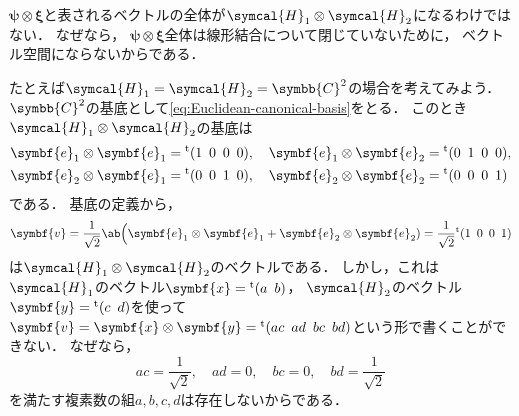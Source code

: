 \documentclass[
]{sotsu}
\newcommand{\bpsi}{\symbf{\psi}}
\newcommand{\bphi}{\symbf{\varphi}}
\newcommand{\bxi}{\symbf{\xi}}
\begin{document}



\bluehead{$\bpsi \otimes \bxi$と書けないテンソル積}\quad 
$\bpsi \otimes \bxi$と表されるベクトルの全体が$\symcal{H}_1 \otimes \symcal{H}_2$になるわけではない．
なぜなら，
$\bpsi \otimes \bxi$全体は線形結合について閉じていないために，
ベクトル空間にならないからである．

たとえば$\symcal{H}_1 = \symcal{H}_2 = \symbb{C}^2$の場合を考えてみよう．
$\symbb{C}^2$の基底として\cref{eq:Euclidean-canonical-basis}をとる．
このとき$\symcal{H}_1 \otimes \symcal{H}_2$の基底は
\begin{equation*}
    \begin{split}
        \symbf{e}_1 \otimes \symbf{e}_1 &= \cvector{1 ; 0 ; 0 ; 0},
        \quad 
        \symbf{e}_1 \otimes \symbf{e}_2 = \cvector{0 ; 1 ; 0 ; 0},
        \\
        \symbf{e}_2 \otimes \symbf{e}_1 &= \cvector{0 ; 0 ; 1 ; 0},
        \quad 
        \symbf{e}_2 \otimes \symbf{e}_2 = \cvector{0 ; 0 ; 0 ; 1}
    \end{split}
\end{equation*}
である．
基底の定義から，
\begin{equation*}
    \symbf{v}
    = \frac{1}{\sqrt{2}} \ab\Big( \symbf{e}_1 \otimes \symbf{e}_1 + \symbf{e}_2 \otimes \symbf{e}_2 )
    = \frac{1}{\sqrt{2}} \cvector{1 ; 0 ; 0 ; 1}
\end{equation*}
は$\symcal{H}_1 \otimes \symcal{H}_2$のベクトルである．
しかし，これは$\symcal{H}_1$のベクトル$\symbf{x} = \cvector{a ; b}$，
$\symcal{H}_2$のベクトル$\symbf{y} = \cvector{c ; d}$を使って$\symbf{v} = \symbf{x} \otimes \symbf{y} = \cvector{ac ; ad ; bc ; bd}$という形で書くことができない．
なぜなら，
\begin{equation*}
    ac = \frac{1}{\sqrt{2}}, \quad 
    ad = 0, \quad 
    bc = 0, \quad 
    bd = \frac{1}{\sqrt{2}}
\end{equation*}
を満たす複素数の組$a, b, c, d$は存在しないからである．
\end{document}
